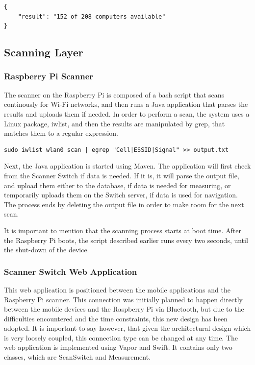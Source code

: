 \begin{lstlisting}
{
    "result": "152 of 208 computers available"
}
\end{lstlisting}

\subsection{Scanning Layer}
\subsubsection{Raspberry Pi Scanner}
The scanner on the Raspberry Pi is composed of a bash script that scans continously for Wi-Fi networks, and then runs a Java application that parses the results and uploads them if needed. In order to perform a scan, the system uses a Linux package, iwlist, and then the results are manipulated by grep, that matches them to a regular expression.
\begin{lstlisting}
sudo iwlist wlan0 scan | egrep "Cell|ESSID|Signal" >> output.txt
\end{lstlisting}

\noindent
Next, the Java application is started using Maven. The application will first check from the Scanner Switch if data is needed. If it is, it will parse the output file, and upload them either to the database, if data is needed for measuring, or temporarily uploads them on the Switch server, if data is used for navigation. The process ends by deleting the output file in order to make room for the next scan.

It is important to mention that the scanning process starts at boot time. After the Raspberry Pi boots, the script described earlier runs every two seconds, until the shut-down of the device.

\subsubsection{Scanner Switch Web Application}
This web application is positioned between the mobile applications and the Raspberry Pi scanner. This connection was initially planned to happen directly between the mobile devices and the Raspberry Pi via Bluetooth, but due to the difficulties encountered and the time constraints, this new design has been adopted. It is important to say however, that given the architectural design which is very loosely coupled, this connection type can be changed at any time. The web application is implemented using Vapor and Swift. It contains only two classes, which are ScanSwitch and Measurement. 


